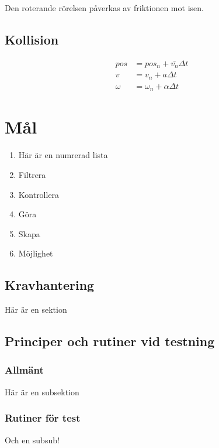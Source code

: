 \documentclass[11pt]{article} %
\begin{document}
 Den roterande rörelsen påverkas av friktionen mot isen. 

\subsection{Kollision}


 \begin{align} %
 pos&=pos_n+\bar{v_n}\Delta t \\  %
 v&=v_n+a \Delta t \\ 
 \omega&=\omega_n+\alpha \Delta t  
 \end{align}



\section{Mål}



\begin{enumerate}
\item Här är en numrerad lista
\item Filtrera 
\item Kontrollera 
\item Göra 
\item Skapa 
\item Möjlighet 
\end{enumerate}


\pagebreak 



\subsection{Kravhantering}

Här är en sektion

\subsection{Principer och rutiner vid testning}

\subsubsection{Allmänt}
Här är en subsektion

\subsubsection{Rutiner för test}
Och en subsub!
\end{document}
